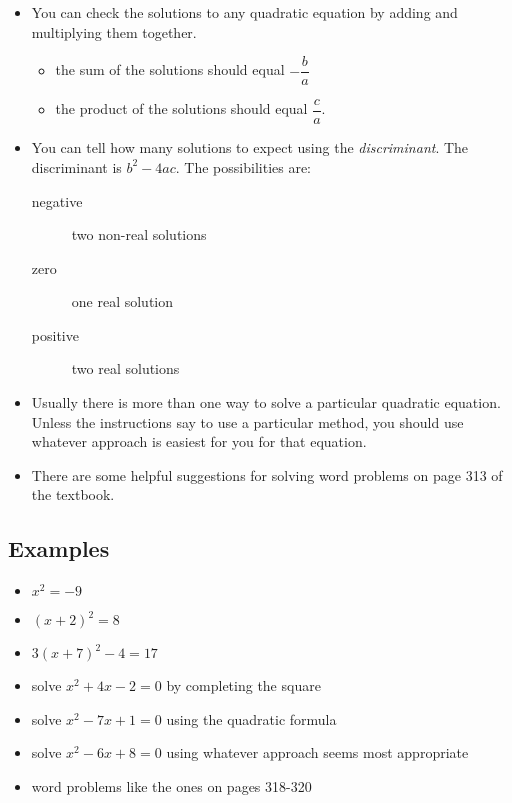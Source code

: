 \documentclass[fleqn,addpoints]{exam}
\begin{document}
\begin{itemize}
\item
You can check the solutions to any quadratic equation by adding and multiplying them together.  
\begin{itemize}
  \item the sum of the solutions should equal $- \dfrac{b}{a}$ 
  \item the product of the solutions should equal $\dfrac{c}{a}$.
\end{itemize}

\item
You can tell how many solutions to expect using the {\em discriminant}.  The discriminant is $b^2 - 4ac$.  The
possibilities are:

\begin{description}
  \item[negative] two non-real solutions
  \item[zero] one real solution
  \item[positive] two real solutions
\end{description}

\item
Usually there is more than one way to solve a particular quadratic equation.  Unless the instructions say to use a
particular method, you should use whatever approach is easiest for you for that equation.

\item
There are some helpful suggestions for solving word problems on page 313 of the textbook.

\end{itemize}

\subsection{Examples}
\begin{itemize}
  \item $x^2 = -9$
  \item $(x+2)^2 = 8$
  \item $3(x+7)^2 -4 = 17$
  \item solve $x^2+4x-2=0$ by completing the square
  \item solve $x^2-7x+1=0$ using the quadratic formula
  \item solve $x^2-6x+8=0$ using whatever approach seems most appropriate
  \item word problems like the ones on pages 318-320
\end{itemize}

\pagebreak
\end{document}
